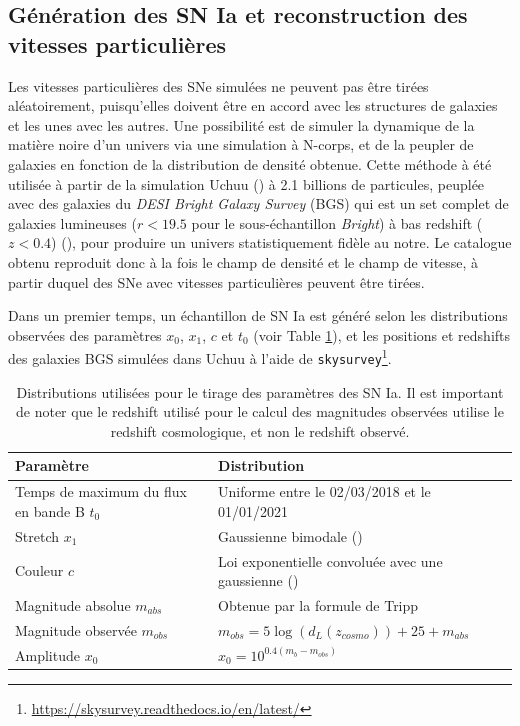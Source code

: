 \documentclass{book}
\def\skysurvey{\texttt{skysurvey}\xspace}
\begin{document}
\subsection{Génération des SN Ia et reconstruction des vitesses particulières}
\label{sec:gne_SN}

Les vitesses particulières des SNe simulées ne peuvent pas être tirées aléatoirement, puisqu'elles doivent être en accord avec les structures de galaxies et les unes avec les autres. Une possibilité est de simuler la dynamique de la matière noire d'un univers via une simulation à N-corps, et de la peupler de galaxies en fonction de la distribution de densité obtenue. Cette méthode à été utilisée à partir de la simulation Uchuu (\cite{prada_desi_2023}) à 2.1 billions de particules, peuplée avec des galaxies du \textit{DESI Bright Galaxy Survey} (BGS) qui est un set complet de galaxies lumineuses ($r < 19.5$ pour le sous-échantillon \textit{Bright}) à bas redshift ($z<0.4$) (\cite{hahn_desi_2023}), pour produire un univers statistiquement fidèle au notre. Le catalogue obtenu reproduit donc à la fois le champ de densité et le champ de vitesse, à partir duquel des SNe avec vitesses particulières peuvent être tirées.

Dans un premier temps, un échantillon de SN Ia est généré selon les distributions observées des paramètres $x_0$, $x_1$, $c$ et $t_0$ (voir Table \ref{tab:snia}), et les positions et redshifts des galaxies BGS simulées dans Uchuu à l'aide de \skysurvey\footnote{\href{https://skysurvey.readthedocs.io/en/latest/}{https://skysurvey.readthedocs.io/en/latest/}}.

\begin{table}
    \centering
    \begin{tabular}{p{6.5cm}|p{7cm}}
         Paramètre & Distribution \\
         \hline
         Temps de maximum du flux en bande B $t_0$ & Uniforme entre le 02/03/2018 et le 01/01/2021\\
         Stretch $x_1$ & Gaussienne bimodale (\cite{nicolas_redshift_2021})\\
         Couleur $c$ &  Loi exponentielle convoluée avec une gaussienne (\cite{ginolin_ztf_2024}) \\
         Magnitude absolue $m_{abs}$ & Obtenue par la formule de Tripp\\
         Magnitude observée $m_{obs}$ & $m_{obs} = 5 \log(d_L(z_{cosmo})) + 25 + m_{abs}$\\
         Amplitude $x_0$ & $x_0 = 10^{0.4(m_b - m_{obs})}$
    \end{tabular}
    \caption{Distributions utilisées pour le tirage des paramètres des SN Ia. Il est important de noter que le redshift utilisé pour le calcul des magnitudes observées utilise le redshift cosmologique, et non le redshift observé.}
    \label{tab:snia}
\end{table}
\end{document}
